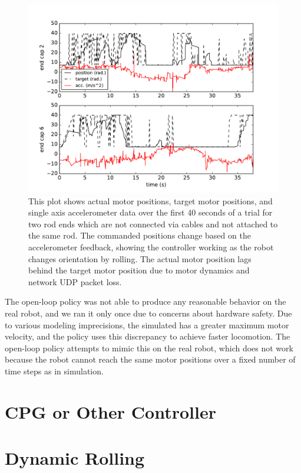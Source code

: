 \begin{figure}[thpb]
    \centering
    \setlength{\unitlength}{0.5\columnwidth}
    \includegraphics[width=\linewidth]{tex/img/plot_motor}
    \caption{
        \label{fig:commands}
        This plot shows actual motor positions, target motor positions, and 
        single axis accelerometer data over the first 40 seconds of a trial
        for two rod ends which are not connected via cables and not attached
        to the same rod. The commanded positions change based on
        the accelerometer feedback, showing the controller working as the robot
        changes orientation by rolling. The actual motor position  
        lags behind the target motor position due to motor dynamics and network UDP packet loss.
    }
\end{figure}

The open-loop policy was not able to produce any reasonable behavior on the real
robot, and we ran it only once due to concerns about hardware safety. 
Due to various modeling
imprecisions, the simulated \SB{} has a greater maximum motor velocity, and the
policy uses this discrepancy to achieve faster locomotion. The open-loop policy
attempts to mimic this on the real robot, which does not work because the robot
cannot reach the same motor positions over a fixed number of time steps as in
simulation. 


\section{CPG or Other Controller}
\label{cpg_controller}

\section{Dynamic Rolling}
\label{dyncamic_rolling}
